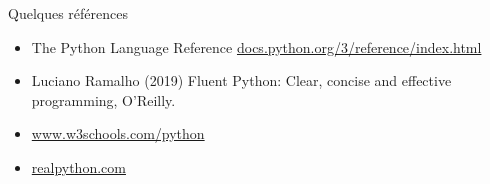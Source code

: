 \documentclass[10pt]{beamer}
\begin{document}
\begin{frame}{Quelques références}
  
  \begin{itemize}
    \item The Python Language Reference
    \href{https://docs.python.org/3/reference/index.html}{docs.python.org/3/reference/index.html}
    \item Luciano Ramalho (2019) Fluent Python: Clear, concise and effective programming, O'Reilly.
    \item \href{https://www.w3schools.com/python}{www.w3schools.com/python}
    \item \href{https://realpython.com/}{realpython.com}
  \end{itemize}
  

\end{frame}


\end{document}
